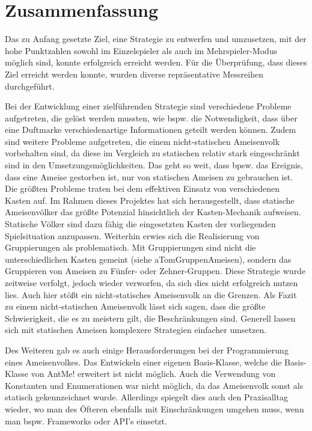 \section{Zusammenfassung}

Das zu Anfang gesetzte Ziel, eine Strategie zu entwerfen und umzusetzen, mit der hohe Punktzahlen sowohl im Einzelspieler als auch im Mehrspieler-Modus möglich sind, konnte erfolgreich erreicht werden. Für die Überprüfung, dass dieses Ziel erreicht werden konnte, wurden diverse repräsentative Messreihen durchgeführt.

Bei der Entwicklung einer zielführenden Strategie sind verschiedene Probleme aufgetreten, die gelöst werden mussten, wie bspw. die Notwendigkeit, dass über eine Duftmarke verschiedenartige Informationen geteilt werden können. Zudem sind weitere Probleme aufgetreten, die einem nicht-statischen Ameisenvolk vorbehalten sind, da diese im Vergleich zu statischen relativ stark eingeschränkt sind in den Umsetzungsmöglichkeiten. Das geht so weit, dass bpsw. das Ereignis, dass eine Ameise gestorben ist, nur von statischen Ameisen zu gebrauchen ist. Die größten Probleme traten bei dem effektiven Einsatz von verschiedenen Kasten auf. Im Rahmen dieses Projektes hat sich herausgestellt, dass statische Ameisenvölker das größte Potenzial hinsichtlich der Kasten-Mechanik aufweisen. Statische Völker sind dazu fähig die eingesetzten Kasten der vorliegenden Spielsituation anzupassen. Weiterhin erwies sich die Realisierung von Gruppierungen als problematisch. Mit Gruppierungen sind nicht die unterschiedlichen Kasten gemeint (siehe aTomGruppenAmeisen), sondern das Gruppieren von Ameisen zu Fünfer- oder Zehner-Gruppen. Diese Strategie wurde zeitweise verfolgt, jedoch wieder verworfen, da sich dies nicht erfolgreich nutzen lies. Auch hier stößt ein nicht-statisches Ameisenvolk an die Grenzen. Als Fazit zu einem nicht-statischen Ameisenvolk lässt sich sagen, dass die größte Schwierigkeit, die es zu meistern gilt, die Beschränkungen sind. Generell lassen sich mit statischen Ameisen komplexere Strategien einfacher umsetzen.

Des Weiteren gab es auch einige Herausforderungen bei der Programmierung eines Ameisenvolkes. Das Entwickeln einer eigenen Basis-Klasse, welche die Basis-Klasse von AntMe! erweitert ist nicht möglich. Auch die Verwendung von Konstanten und Enumerationen war nicht möglich, da das Ameisenvolk sonst als statisch gekennzeichnet wurde. Allerdings spiegelt dies auch den Praxisalltag wieder, wo man des Öfteren ebenfalls mit Einschränkungen umgehen muss, wenn man bspw. Frameworks oder API's einsetzt.